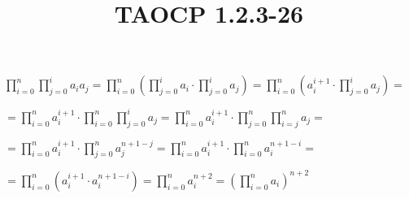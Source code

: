 \documentclass{article}
\title{TAOCP 1.2.3\mbox{-}26}
\begin{document}
\maketitle

\( \prod_{i=0}^{n}\prod_{j=0}^{i} a_{i}a_{j} = \prod_{i=0}^{n}(\prod_{j=0}^{i} a_{i} \cdot \prod_{j=0}^{i} a_{j}) = \prod_{i=0}^{n}(a_{i}^{i+1} \cdot \prod_{j=0}^{i} a_{j}) = \)

\( = \prod_{i=0}^{n} a_{i}^{i+1} \cdot \prod_{i=0}^{n} \prod_{j=0}^{i} a_{j} = \prod_{i=0}^{n} a_{i}^{i+1} \cdot \prod_{j=0}^{n} \prod_{i=j}^{n} a_{j} = \)

\( = \prod_{i=0}^{n} a_{i}^{i+1} \cdot \prod_{j=0}^{n} a_{j}^{n+1-j} = \prod_{i=0}^{n} a_{i}^{i+1} \cdot \prod_{i=0}^{n} a_{i}^{n+1-i} = \)

\( = \prod_{i=0}^{n} (a_{i}^{i+1} \cdot a_{i}^{n+1-i}) = \prod_{i=0}^{n} a_{i}^{n+2} = {(\prod_{i=0}^{n} a_{i})}^{n+2} \)
\end{document}
